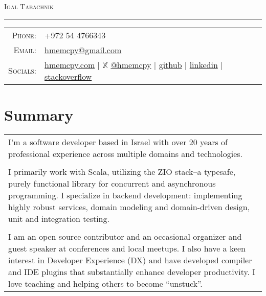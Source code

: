\documentclass[a4paper,11pt]{article}
\begin{document}
\par{\centering
		{\Huge \textsc{Igal Tabachnik}
	}\bigskip\par}

\hrule
\vspace{0.5em}
\begin{tabular}{rl}
  \textsc{Phone:}     & +972 54 4766343\\
  \textsc{Email:}     & \href{mailto:hmemcpy@gmail.com}{hmemcpy@gmail.com}\\
  \textsc{Socials:}   & \faHome{} \href{https://hmemcpy.com}{hmemcpy.com} 
                      | $\mathbb{X}$ \href{https://twitter.com/hmemcpy}{@hmemcpy}
                      | \faGithub{} \href{https://github.com/hmemcpy}{github}
                      | \faLinkedin{} \href{https://www.linkedin.com/in/igaltabachnik/}{linkedin}
                      | \faStackOverflow{} \href{https://stackoverflow.com/users/8205/igal-tabachnik}{stackoverflow}
\end{tabular}

\section{Summary}
\begin{tabular}{p{}}
  I'm a software developer based in Israel with over 20 years of professional experience across multiple domains and technologies.\\\\

  I primarily work with Scala, utilizing the ZIO stack--a typesafe, purely functional library for concurrent and asynchronous programming. I specialize in backend development: implementing highly robust services, domain modeling and domain-driven design, unit and integration testing.\\\\

   I am an open source contributor and an occasional organizer and guest speaker at conferences and local meetups. I also have a keen interest in Developer Experience (DX) and have developed compiler and IDE plugins that substantially enhance developer productivity. I love teaching and helping others to become ``unstuck''.
\end{tabular}
\end{document}
